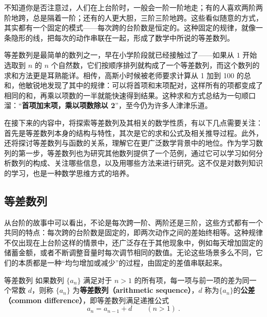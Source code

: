 
\begin{issues}
\issueDraft
\end{issues}


不知道你是否注意过，人们在上台阶时，一般会一阶一阶地走；有的人喜欢两阶两阶地跨，总是隔着一阶；还有的人更大胆，三阶三阶地跨。这些看似随意的方式，其实都有一个固定的模式——每次跨的台阶数是恒定的。这种固定的规律，就像一条隐形的线，把每次的动作串联在一起，形成了数学中所说的等差数列。

等差数列是最简单的数列之一，早在小学阶段就已经接触过了——如果从 $1$ 开始选取到  $n$  的  $n$  个自然数，它们按顺序排列就构成了一个等差数列，而这个数列的求和方法更是耳熟能详。相传，高斯小时候被老师要求计算从 1 加到 100 的总和，他敏锐地发现了其中的规律：可以将首项和末项配对，这样所有的项都变成了相同的和，再乘以项数的一半就能快速得到结果。这种求和方式总结为一句顺口溜：“\textbf{首项加末项，乘以项数除以 2}”，至今仍为许多人津津乐道。

在接下来的内容中，将探索等差数列及其相关的数学性质，有以下几点需要关注：首先是等差数列本身的结构与特性，其次是它的求和公式及相关推导过程。此外，还将探讨等差数列与函数的关系，理解它在更广泛数学背景中的地位。作为学习数列的第一步，等差数列也为研究其他数列提供了一个范例，通过它可以学习如何分析数列的构成、关注哪些信息，以及用哪些方法来进行研究。这不仅是对数列知识的学习，也是一种数学思维方式的培养。

\subsection{等差数列}

从台阶的故事中可以看出，不论是每次跨一阶、两阶还是三阶，这些方式都有一个共同的特点：每次跨的台阶数是固定的，即两次动作之间的差始终相等。这种规律不仅出现在上台阶这样的情景中，还广泛存在于其他现象中，例如每天增加固定的储蓄金额，或者不断调整音量时每次调节相同的数值。无论这些场景多么不同，它们的本质都是一种“均匀增加或减少”的过程，由固定的差值串联起来。

\begin{definition}{等差数列}
如果数列 $\{a_n\}$ 满足对于 $n > 1$ 的所有项，每一项与前一项的差为同一个常数 $d$，则称 $\{a_n\}$ 为\textbf{等差数列（arithmetic sequence）}，$d$ 称为$\{a_n\}$的\textbf{公差（common difference）}，即等差数列满足递推公式
\begin{equation}
a_{n}=a_{n-1}+d\qquad(n>1)~.
\end{equation}
\end{definition}

